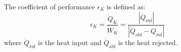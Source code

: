 The coefficient of performance \( \epsilon_K \) is defined as:  
\[
\epsilon_K = \frac{\dot{Q}_K}{\dot{W}_K} = \frac{|\dot{Q}_{\text{zul}}|}{|\dot{Q}_{\text{abl}} - \dot{Q}_{\text{zul}}|}
\]  
where \( \dot{Q}_{\text{zul}} \) is the heat input and \( \dot{Q}_{\text{abl}} \) is the heat rejected.